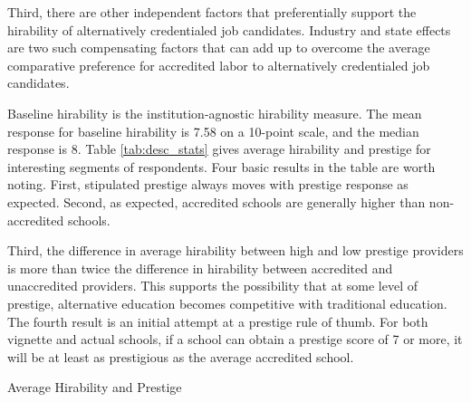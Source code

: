 \documentclass[review]{elsarticle}
\begin{document}
Third, there are other independent factors that preferentially support the hirability of alternatively credentialed job candidates.
Industry and state effects are two such compensating factors that can add up to overcome the average comparative preference for accredited labor to alternatively credentialed job candidates.

Baseline hirability is the institution-agnostic hirability measure.
The mean response for baseline hirability is 7.58 on a 10-point scale, and the median response is 8.
Table \ref{tab:desc_stats} gives average hirability and prestige for interesting segments of respondents.
Four basic results in the table are worth noting.
First, stipulated prestige always moves with prestige response as expected.
Second, as expected, accredited schools are generally higher than non-accredited schools.

Third, the difference in average hirability between high and low prestige providers
is more than twice the difference in hirability between accredited and unaccredited providers.
This supports the possibility that at some level of prestige,
alternative education becomes competitive with traditional education.
The fourth result is an initial attempt at a prestige rule of thumb.
For both vignette and actual schools,
if a school can obtain a prestige score of 7 or more,
it will be at least as prestigious as the average accredited school.

\begin{table}
    \caption{Average Hirability and Prestige}
    \resizebox{\columnwidth}{!}{
        
    }
    \label{tab:desc_stats}
\end{table}

\end{document}
